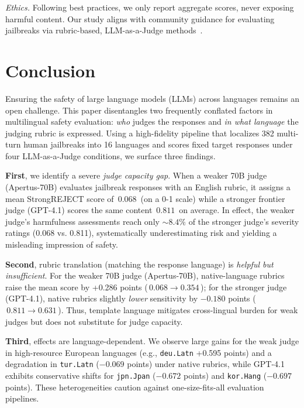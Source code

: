 \vspace{4pt}
\noindent\emph{Ethics.} Following best practices, we only report aggregate scores, never exposing harmful content. Our study aligns with community guidance for evaluating jailbreaks via rubric-based, LLM-as-a-Judge methods~\citep{souly2024strongreject, li2024mhj}.




\section{Conclusion}
\label{sec:conclusion}
Ensuring the safety of large language models (LLMs) across languages remains an open challenge. This paper disentangles two frequently conflated factors in multilingual safety evaluation: \emph{who} judges the responses and \emph{in what language} the judging rubric is expressed. Using a high-fidelity pipeline that localizes 382 multi-turn human jailbreaks into 16 languages and scores fixed target responses under four LLM-as-a-Judge conditions, we surface three findings.

\textbf{First}, we identify a severe \emph{judge capacity gap}. When a weaker 70B judge (Apertus-70B) evaluates jailbreak responses with an English rubric, it assigns a mean StrongREJECT score of \(\,0.068\,\) (on a 0-1 scale) while a stronger frontier judge (GPT-4.1) scores the same content \(\,0.811\,\) on average. In effect, the weaker judge's harmfulness assessments reach only \(\sim 8.4\%\) of the stronger judge's severity ratings (0.068 vs. 0.811), systematically underestimating risk and yielding a misleading impression of safety.

\textbf{Second}, rubric translation (matching the response language) is \emph{helpful but insufficient}. For the weaker 70B judge (Apertus-70B), native-language rubrics raise the mean score by +0.286 points (\(\,0.068\rightarrow 0.354\,\)); for the stronger judge (GPT-4.1), native rubrics slightly \emph{lower} sensitivity by $-0.180$ points (\(\,0.811\rightarrow 0.631\,\)). Thus, template language mitigates cross-lingual burden for weak judges but does not substitute for judge capacity.

\textbf{Third}, effects are language-dependent. We observe large gains for the weak judge in high-resource European languages (e.g., \texttt{deu.Latn} +0.595 points) and a degradation in \texttt{tur.Latn} ($-0.069$ points) under native rubrics, while GPT-4.1 exhibits conservative shifts for \texttt{jpn.Jpan} ($-0.672$ points) and \texttt{kor.Hang} ($-0.697$ points). These heterogeneities caution against one-size-fits-all evaluation pipelines.

